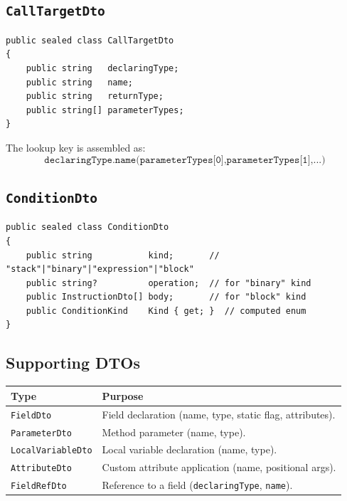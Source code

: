 \documentclass[11pt,a4paper]{article}
\newcommand{\code}[1]{\texttt{\small #1}}
\newcommand{\typename}[1]{\textcolor{typecolor}{\texttt{\small #1}}}
\begin{document}
\subsection{\texttt{CallTargetDto}}

\begin{lstlisting}[style=cs]
public sealed class CallTargetDto
{
    public string   declaringType;
    public string   name;
    public string   returnType;
    public string[] parameterTypes;
}
\end{lstlisting}

The lookup key is assembled as:
\[
\texttt{declaringType.name(parameterTypes[0],parameterTypes[1],...)}
\]

\subsection{\texttt{ConditionDto}}

\begin{lstlisting}[style=cs]
public sealed class ConditionDto
{
    public string           kind;       // "stack"|"binary"|"expression"|"block"
    public string?          operation;  // for "binary" kind
    public InstructionDto[] body;       // for "block" kind
    public ConditionKind    Kind { get; }  // computed enum
}
\end{lstlisting}

\subsection{Supporting DTOs}

\begin{longtable}{lp{9.5cm}}
  \toprule
  \textbf{Type} & \textbf{Purpose} \\
  \midrule
  \endhead
  \typename{FieldDto}         & Field declaration (name, type, static flag, attributes). \\
  \typename{ParameterDto}     & Method parameter (name, type). \\
  \typename{LocalVariableDto} & Local variable declaration (name, type). \\
  \typename{AttributeDto}     & Custom attribute application (name, positional args). \\
  \typename{FieldRefDto}      & Reference to a field (\code{declaringType}, \code{name}). \\
  \bottomrule
\end{longtable}

\end{document}
